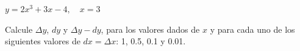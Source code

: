 \setcounter{enumi}{20}
\item $y = 2x^3 + 3x - 4, \quad x = 3$
\par
Calcule $\Delta y$, $dy$ y $\Delta y - dy$, para los valores dados de $x$ y para cada uno de los siguientes valores de $dx = \Delta x$: 1, 0.5, 0.1 y 0.01.
